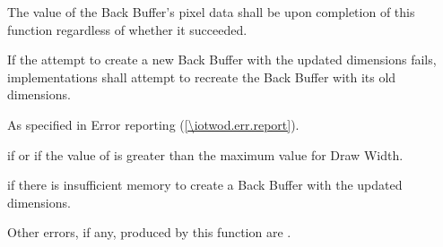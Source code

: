 \begin{itemdescr}
\pnum
The value of the Back Buffer's pixel data shall be \unspecnorm upon completion of this function regardless of whether it succeeded.

\pnum
If the attempt to create a new Back Buffer with the updated dimensions fails, implementations shall attempt to recreate the Back Buffer with its old dimensions.

\pnum
\throws
As specified in Error reporting (\ref{\iotwod.err.report}).

\pnum
\errors
{} if  or if the value of  is greater than the maximum value for Draw Width.

 if there is insufficient memory to create a Back Buffer with the updated dimensions.

Other errors, if any, produced by this function are .
\end{itemdescr}


